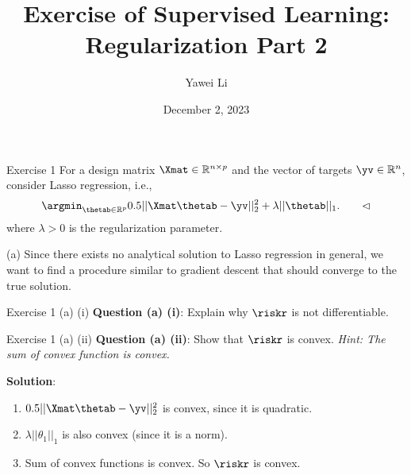 \documentclass[aspectratio=169]{beamer}
\title[]{\textbf{Exercise of Supervised Learning: \\ Regularization Part 2}}
\author{Yawei Li}
\institute[LMU]
{
\\
  \texttt{yawei.li@stat.uni-muenchen.de}
}
\date{December 2, 2023}
\begin{document}
\begin{frame}
\titlepage

\end{frame}


\begin{frame}{Exercise 1}
	For a design matrix $\Xmat \in \mathbb{R}^{n \times p}$ and the vector of targets $\yv \in \mathbb{R}^n$, consider Lasso regression, i.e., 
	$$\argmin_{\thetab \in \mathbb{R}^p} 0.5 || \Xmat \thetab - \yv ||_2^2 + \lambda ||\thetab||_1. \qquad \lhd$$
	where $\lambda > 0$ is the regularization parameter.
	
	(a) Since there exists no analytical solution to Lasso regression in general, we want to find a procedure similar to gradient descent that should converge to the true solution.
	
	\vspace{10pt}
\end{frame}

\begin{frame}{Exercise 1 (a) (i)}
	\textbf{Question (a) (i)}: Explain why $\riskr$ is not differentiable.
	
	\vspace{10pt}
\end{frame}

\begin{frame}{Exercise 1 (a) (ii)}
	\textbf{Question (a) (ii)}: Show that $\riskr$ is convex. \emph{Hint: The sum of convex function is convex.}
	
	\vspace{10pt} 
	
	\textbf{Solution}: 
		\begin{enumerate}
			\item<2-> $0.5 ||\Xmat \thetab - \yv ||_2^2$ is convex, since it is quadratic.
			\item<3-> $\lambda || \theta_1 ||_1$ is also convex (since it is a norm).
			\item<4-> Sum of convex functions is convex. So $\riskr$ is convex.
		\end{enumerate}
\end{frame}
\end{document}
